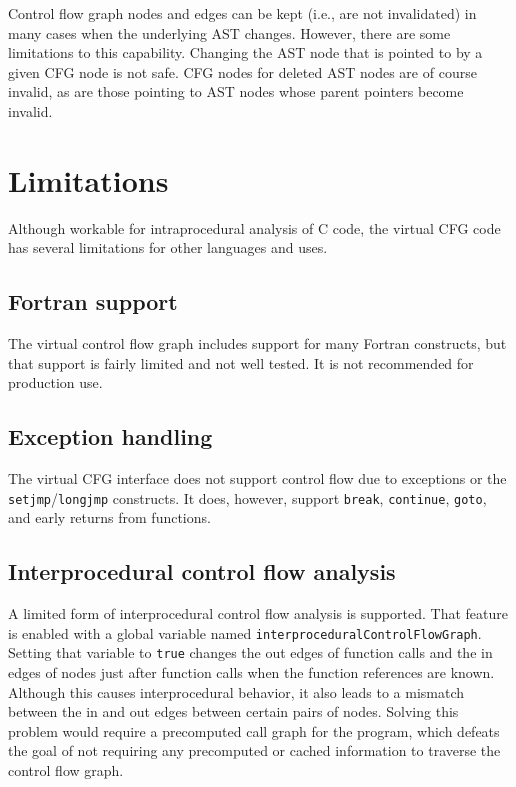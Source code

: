 Control flow graph nodes and edges can be kept (i.e., are not invalidated)
in many cases when the underlying AST changes.  However, there are some
limitations to this capability.  Changing the AST node that is pointed to
by a given CFG node is not safe.  CFG nodes for deleted AST nodes are of
course invalid, as are those pointing to AST nodes whose parent pointers
become invalid.

\section{Limitations}

Although workable for intraprocedural analysis of C code, the virtual CFG
code has several limitations for other languages and uses.

\subsection{Fortran support}

The virtual control flow graph includes support for many Fortran
constructs, but that support is fairly limited and not well tested.  It is
not recommended for production use.

\subsection{Exception handling}

The virtual CFG interface does not support control flow due to exceptions
or the \lstinline{setjmp}/\lstinline{longjmp} constructs.
It does, however, support \lstinline{break}, \lstinline{continue},
\lstinline{goto}, and early returns from functions.

\subsection{Interprocedural control flow analysis}

A limited form of interprocedural control flow analysis is supported.  That
feature is enabled with a global variable named
\lstinline{interproceduralControlFlowGraph}.  Setting that variable to
\lstinline{true} changes the out edges of function calls and the in edges
of nodes just after function calls when the function references are known.
Although this causes interprocedural behavior, it also leads to a mismatch
between the in and out edges between certain pairs of nodes.  Solving this
problem would require a precomputed call graph for the program, which
defeats the goal of not requiring any precomputed or cached information to
traverse the control flow graph.

